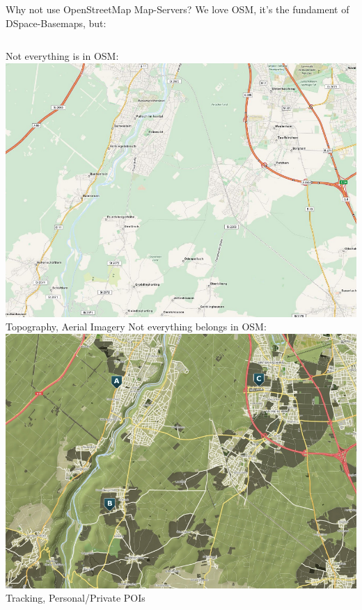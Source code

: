 \documentclass{beamer}
\begin{document}
\begin{frame}{Why not use OpenStreetMap Map-Servers?}
 {\small We love OSM, it's the fundament of DSpace-Basemaps, but: }
 \linebreak
 \begin{columns}
   {\small Not everything is in OSM:\vspace{1em}}
   \includegraphics[scale=0.169]{map_render_osm}
   \linebreak
   {\small Topography, Aerial Imagery}
   {\small Not everything belongs in OSM:\vspace{1em}}
   \includegraphics[scale=0.169]{map_render_dspace}
   \linebreak
   {\small Tracking, Personal/Private POIs}
 \end{columns}
\end{frame}
\end{document}
